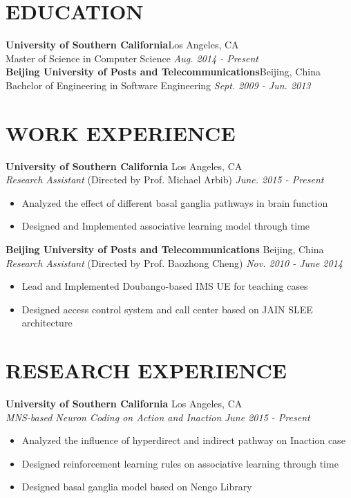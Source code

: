 \documentclass[margin]{res}
\begin{document}
\thispagestyle{empty}

\begin{resume}
\section{EDUCATION}
{\bf University of Southern California}\hfill Los Angeles, CA \\
Master of Science in Computer Science \hfill {\em Aug. 2014 - Present} \\[8pt]
{\bf Beijing University of Posts and Telecommunications}\hfill Beijing, China \\
Bachelor of Engineering in Software Engineering \hfill {\em Sept. 2009 - Jun. 2013}
 
\section{WORK EXPERIENCE}
{\bf University of Southern California} \hfill  Los Angeles, CA \\[2pt]
{\em Research Assistant} (Directed by Prof. Michael Arbib) \hfill {\em June. 2015 - Present} \\[-8pt]
\begin{itemize}[topsep=-1pt,parsep=1pt]
\item Analyzed the effect of different basal ganglia pathways in brain function
\item Designed and Implemented associative learning model through time
\end{itemize}

{\bf Beijing University of Posts and Telecommunications} \hfill Beijing, China \\[2pt]
{\em Research Assistant} (Directed by Prof. Baozhong Cheng) \hfill {\em Nov. 2010 - June 2014} \\[-8pt]
\begin{itemize}[topsep=-1pt,parsep=1pt]
\item Lead and Implemented Doubango-based IMS UE for teaching cases
\item Designed access control system and call center based on JAIN SLEE architecture
\end{itemize}

\section{RESEARCH EXPERIENCE}
{\bf University of Southern California} \hfill Los Angeles, CA \\[8pt]
{\em MNS-based Neuron Coding on Action and Inaction} \hfill {\em June 2015 - Present} \\[-8pt]
\begin{itemize}[topsep=-1pt,parsep=1pt]
\item Analyzed the influence of hyperdirect and indirect pathway on Inaction case
\item Designed reinforcement learning rules on associative learning through time
\item Designed basal ganglia model based on Nengo Library
\end{itemize}


\end{resume}
\end{document}
